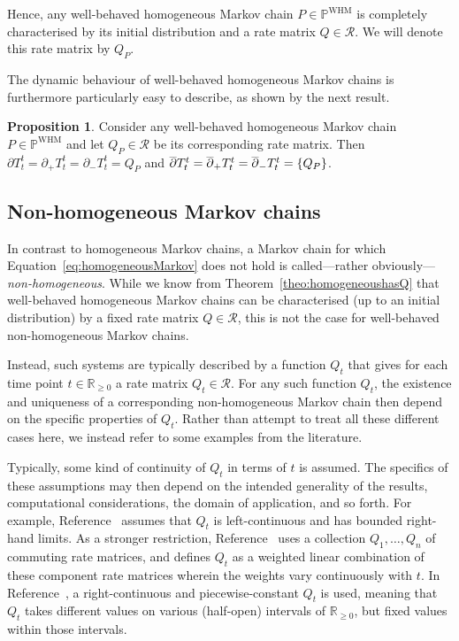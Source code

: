 \documentclass[10pt,a4paper]{paper}
\theoremstyle{definition}
\newtheorem{proposition}[theorem]{Proposition}
\newcommand{\reals}{\mathbb{R}}
\newcommand{\realsnonneg}{\reals_{\geq 0}}
\newcommand{\processes}{\mathbb{P}}
\newcommand{\whmprocesses}{\processes^{\mathrm{WHM}}}
\begin{document}
Hence, any well-behaved homogeneous Markov chain $P\in\whmprocesses$ is completely characterised by its initial distribution and a rate matrix $Q\in\mathcal{R}$. We will denote this rate matrix by $Q_P$.


The dynamic behaviour of well-behaved homogeneous Markov chains is furthermore particularly easy to describe, as shown by the next result.
\begin{proposition}\label{prop:Q_is_singleton_deriv_for_homogen}
Consider any well-behaved homogeneous Markov chain $P\in\whmprocesses$ and let $Q_P\in\mathcal{R}$ be its corresponding rate matrix. Then $\partial T_t^t=\partial_+T_t^t=\partial_-T_t^t=Q_P$ and $\smash{\overline{\partial}}T_t^t=\smash{\overline{\partial}_+}T_t^t=\smash{\overline{\partial}_-}T_t^t=\{Q_P\}$.%
\end{proposition}

\subsection{Non-homogeneous Markov chains}\label{sec:nonhomogen_markov}

In contrast to homogeneous Markov chains, a Markov chain for which Equation~\eqref{eq:homogeneousMarkov} does not hold is called---rather obviously---\emph{non-homogeneous}. While we know from Theorem~\ref{theo:homogeneoushasQ} that well-behaved homogeneous Markov chains can be characterised (up to an initial distribution) by a fixed rate matrix $Q\in\mathcal{R}$, this is not the case for well-behaved non-homogeneous Markov chains. 

Instead, such systems are typically described by a function $Q_t$ that gives for each time point $t\in\realsnonneg$ a rate matrix $Q_t\in\mathcal{R}$. For any such function $Q_t$, the existence and uniqueness of a corresponding non-homogeneous Markov chain then depend on the specific properties of $Q_t$. Rather than attempt to treat all these different cases here, we instead refer to some examples from the literature. 

Typically, some kind of continuity of $Q_t$ in terms of $t$ is assumed. The specifics of these assumptions may then depend on the intended generality of the results, computational considerations, the domain of application, and so forth. For example, Reference~\cite{aalen1978empirical} assumes that $Q_t$ is left-continuous and has bounded right-hand limits. As a stronger restriction, Reference~\cite{johnson1989nonhomogeneous} uses a collection $Q_1,\ldots,Q_n$ of commuting rate matrices, and defines $Q_t$ as a weighted linear combination of these component rate matrices wherein the weights vary continuously with $t$. In Reference~\cite{rindos1995exact}, a right-continuous and piecewise-constant $Q_t$ is used, meaning that $Q_t$ takes different values on various (half-open) intervals of $\realsnonneg$, but fixed values within those intervals.
\end{document}

